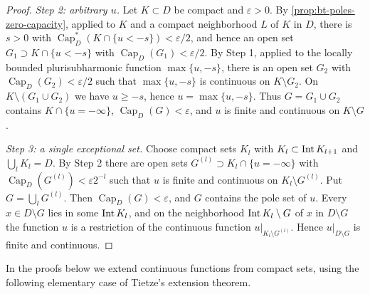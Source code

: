 \begin{proof}
\emph{Step 2: arbitrary $u$.} Let $K\subset D$ be compact and $\varepsilon>0$. By \cref{prop:bt-poles-zero-capacity}, applied to $K$ and a compact neighborhood $L$ of $K$ in $D$, there is $s>0$ with $\operatorname{Cap}^*_D(K\cap\{u<-s\})<\varepsilon/2$, and hence an open set $G_1\supset K\cap\{u<-s\}$ with $\operatorname{Cap}_D(G_1)<\varepsilon/2$. By Step 1, applied to the locally bounded plurisubharmonic function $\max\{u,-s\}$, there is an open set $G_2$ with $\operatorname{Cap}_D(G_2)<\varepsilon/2$ such that $\max\{u,-s\}$ is continuous on $K\setminus G_2$. On $K\setminus(G_1\cup G_2)$ we have $u\ge-s$, hence $u=\max\{u,-s\}$. Thus $G=G_1\cup G_2$ contains $K\cap\{u=-\infty\}$, $\operatorname{Cap}_D(G)<\varepsilon$, and $u$ is finite and continuous on $K\setminus G$.

\emph{Step 3: a single exceptional set.} Choose compact sets $K_l$ with $K_l\subset\operatorname{Int} K_{l+1}$ and $\bigcup_lK_l=D$. By Step 2 there are open sets $G^{(l)}\supset K_l\cap\{u=-\infty\}$ with $\operatorname{Cap}_D(G^{(l)})<\varepsilon2^{-l}$ such that $u$ is finite and continuous on $K_l\setminus G^{(l)}$. Put $G=\bigcup_lG^{(l)}$. Then $\operatorname{Cap}_D(G)<\varepsilon$, and $G$ contains the pole set of $u$. Every $x\in D\setminus G$ lies in some $\operatorname{Int} K_l$, and on the neighborhood $\operatorname{Int} K_l\setminus G$ of $x$ in $D\setminus G$ the function $u$ is a restriction of the continuous function $u|_{K_l\setminus G^{(l)}}$. Hence $u|_{D\setminus G}$ is finite and continuous.
\end{proof}

In the proofs below we extend continuous functions from compact sets, using the following elementary case of Tietze's extension theorem.

